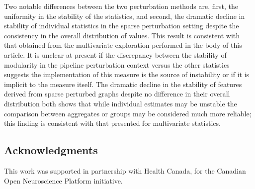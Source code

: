 \documentclass[10pt,letterpaper]{article}
\begin{document}
Two notable differences between the two perturbation methods are, first, the
uniformity in the stability of the statistics, and second, the dramatic decline in
stability of individual statistics in the sparse perturbation setting despite the
consistency in the overall distribution of values. This result is consistent with
that obtained from the multivariate exploration performed in the body of this
article. It is unclear at present if the discrepancy between the stability of
modularity in the pipeline perturbation context versus the other statistics suggests
the implementation of this measure is the source of instability or if it is implicit
to the measure itself. The dramatic decline in the stability of features derived
from sparse perturbed graphs despite no difference in their overall distribution
both shows that while individual estimates may be unstable the comparison between
aggregates or groups may be considered much more reliable; this finding is consistent 
with that presented for multivariate statistics.

\subsection*{Acknowledgments} 
This work was supported in partnership with Health Canada, for the Canadian Open Neuroscience Platform initiative.

\nolinenumbers
\end{document}
